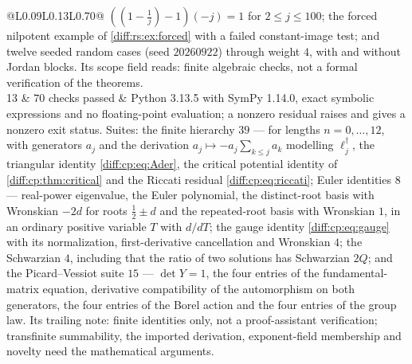 \documentclass[11pt,letterpaper]{article}
\numberwithin{equation}{section}
\theoremstyle{definition}
\theoremstyle{remark}
\begin{document}
\begin{longtable}{@{}L{0.09\textwidth}L{0.13\textwidth}L{0.70\textwidth}@{}}
$((1-\tfrac1j)-1)(-j)=1$ for $2\leq j\leq100$; the forced nilpotent example of
\cref{diff:rs:ex:forced} with a failed constant-image test; and twelve seeded
random cases (seed $20260922$) through weight $4$, with and without Jordan blocks.
Its scope field reads: finite algebraic checks, not a formal verification of the
theorems. \\[0.3em]
13 & $70$ checks passed &
Python 3.13.5 with SymPy 1.14.0, exact symbolic expressions and no
floating-point evaluation; a nonzero residual raises and gives a nonzero exit
status. Suites: the finite hierarchy $39$ --- for lengths $n=0,\dots,12$, with
generators $a_{j}$ and the derivation $a_{j}\mapsto-a_{j}\sum_{k\leq j}a_{k}$
modelling $\ell_{j}^{\dagger}$, the triangular identity \cref{diff:cp:eq:Ader},
the critical potential identity of \cref{diff:cp:thm:critical} and the Riccati
residual \cref{diff:cp:eq:riccati}; Euler identities $8$ --- real-power
eigenvalue, the Euler polynomial, the distinct-root basis with Wronskian $-2d$
for roots $\frac12\pm d$ and the repeated-root basis with Wronskian $1$, in an
ordinary positive variable $T$ with $d/dT$; the gauge identity
\cref{diff:cp:eq:gauge} with its normalization, first-derivative cancellation
and Wronskian $4$; the Schwarzian $4$, including that the ratio of two solutions
has Schwarzian $2Q$; and the Picard--Vessiot suite $15$ --- $\det Y=1$, the four
entries of the fundamental-matrix equation, derivative compatibility of the
automorphism on both generators, the four entries of the Borel action and the
four entries of the group law. Its trailing note: finite identities only, not a
proof-assistant verification; transfinite summability, the imported derivation,
exponent-field membership and novelty need the mathematical arguments. \\
\bottomrule
\end{longtable}
\end{document}
